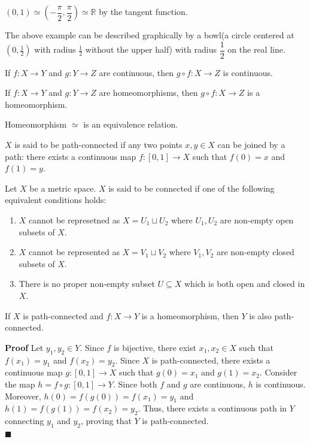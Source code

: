 \documentclass[main.tex]{subfiles}
\begin{document}
\begin{example}
    $(0, 1) \simeq (-\dfrac{\pi}{2}, \dfrac{\pi}{2})\simeq \mathbb{R}$ by the tangent function. 
\end{example}
\par The above example can be described graphically by a bowl(a circle centered at $(0, \frac{1}{2})$ with radius $\frac{1}{2}$ without the upper half) with radius $\dfrac{1}{2}$ on the real line.


\begin{property}
    If $f: X \rightarrow Y$ and $g: Y \rightarrow Z$ are continuous, then $g \circ f: X \rightarrow Z$ is continuous.
\end{property}

\begin{corollary}
    If $f: X \rightarrow Y$ and $g: Y \rightarrow Z$ are homeomorphisms, then $g \circ f: X \rightarrow Z$ is a homeomorphism. 
\end{corollary}

\begin{property}
    Homeomorphism $\simeq $ is an equivalence relation. 
\end{property}

\begin{definition}
    $X$ is said to be path-connected if any two points $x,y \in X$ can be joined by a path: there exists a continuous map $f: [0,1] \rightarrow X$ such that $f(0) = x$ and $f(1) = y$.
\end{definition}

\begin{definition}
    Let $X$ be a metric space. $X$ is said to be connected if one of the following equivalent conditions holds: 
    \begin{enumerate}
        \item $X$ cannot be represetned as $X = U_1 \sqcup U_2$ where $U_1, U_2$ are non-empty open subsets of $X$.
        \item $X$ cannot be represented as $X = V_1 \sqcup V_2$ where $V_1, V_2$ are non-empty closed subsets of $X$. 
        \item There is no proper non-empty subset $U \subseteq X$ which is both open and closed in $X$.
    \end{enumerate}
\end{definition}

\begin{property}
    If $X$ is path-connected and $f: X \rightarrow Y$ is a homeomorphism, then $Y$ is also path-connected. 
\end{property}
\par \noindent \textbf{Proof} Let $y_1, y_2 \in Y$. Since $f$ is bijective, there exist $x_1, x_2 \in X$ such that $f(x_1) = y_1$ and $f(x_2) = y_2$. Since $X$ is path-connected, there exists a continuous map $g: [0,1] \rightarrow X$ such that $g(0) = x_1$ and $g(1) = x_2$. Consider the map $h = f \circ g: [0,1] \rightarrow Y$. Since both $f$ and $g$ are continuous, $h$ is continuous. Moreover, $h(0) = f(g(0)) = f(x_1) = y_1$ and $h(1) = f(g(1)) = f(x_2) = y_2$. Thus, there exists a continuous path in $Y$ connecting $y_1$ and $y_2$, proving that $Y$ is path-connected. 
\\ \null \hfill $\blacksquare$
\end{document}
